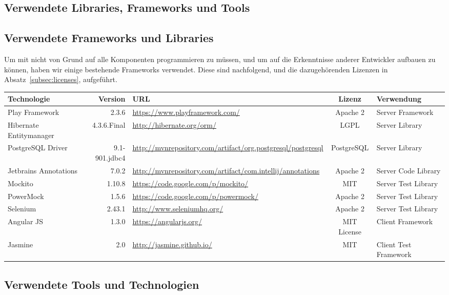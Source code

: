 \begin{landscape}
\chapter{Verwendete Libraries, Frameworks und Tools}

	\section{Verwendete Frameworks und Libraries}		
	Um mit nicht von Grund auf alle Komponenten programmieren zu müssen, 
	und um auf die Erkenntnisse anderer Entwickler aufbauen zu können,
	haben wir einige bestehende Frameworks verwendet.
	Diese sind nachfolgend, und die dazugehörenden Lizenzen in Absatz\ \ref{subsec:licenses}, aufgeführt.
	
	
	\vspace{0.5cm}
	
	\newcommand{\addLib}[5]{
		#1 & #2 & \url{#3} & #4 & #5 \\
		\hline
	}
	
	
	\begin{tabularx}{\linewidth}{| l r | X | c | l |}
		\hline
		\textbf{Technologie} & \textbf{Version} & \textbf{URL} & \textbf{Lizenz} & \textbf{Verwendung} \\
		\hline \hline
		\addLib{Play Framework}{2.3.6}{https://www.playframework.com/}{Apache 2}{Server Framework}
		\addLib{Hibernate Entitymanager}{4.3.6.Final}{http://hibernate.org/orm/}{LGPL}{Server Library}
		\addLib{PostgreSQL Driver}{9.1-901.jdbc4}{http://mvnrepository.com/artifact/org.postgresql/postgresql}{PostgreSQL}{Server Library}
		\addLib{Jetbrains Annotations}{7.0.2}{http://mvnrepository.com/artifact/com.intellij/annotations}{Apache 2}{Server Code Library}
		\addLib{Mockito}{1.10.8}{https://code.google.com/p/mockito/}{MIT}{Server Test Library}
		\addLib{PowerMock}{1.5.6}{https://code.google.com/p/powermock/}{Apache 2}{Server Test Library}
		\addLib{Selenium}{2.43.1}{http://www.seleniumhq.org/}{Apache 2}{Server Test Library}
		\addLib{Angular JS}{1.3.0}{https://angularjs.org/}{MIT License}{Client Framework}
		\addLib{Jasmine}{2.0}{http://jasmine.github.io/}{MIT}{Client Test Framework}
	\end{tabularx}

	\section{Verwendete Tools und Technologien}
	

\end{landscape}
